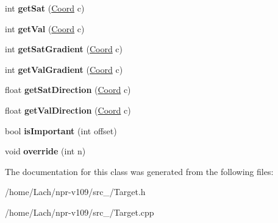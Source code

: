 \begin{DoxyCompactItemize}
\hypertarget{classTarget_a926aa4ee64a304bb5bd531618f169177}{}\label{classTarget_a926aa4ee64a304bb5bd531618f169177} 
int {\bfseries get\+Sat} (\hyperlink{structCoord}{Coord} c)
\item 
\hypertarget{classTarget_ac38c919ecd0a1965f97747fa289e2eef}{}\label{classTarget_ac38c919ecd0a1965f97747fa289e2eef} 
int {\bfseries get\+Val} (\hyperlink{structCoord}{Coord} c)
\item 
\hypertarget{classTarget_a241d781ae2c23024f84fc11f0937e91f}{}\label{classTarget_a241d781ae2c23024f84fc11f0937e91f} 
int {\bfseries get\+Sat\+Gradient} (\hyperlink{structCoord}{Coord} c)
\item 
\hypertarget{classTarget_aeb30c869530b4494f2e141a1a81df15e}{}\label{classTarget_aeb30c869530b4494f2e141a1a81df15e} 
int {\bfseries get\+Val\+Gradient} (\hyperlink{structCoord}{Coord} c)
\item 
\hypertarget{classTarget_a5f8130358abc7aabbfe6c8434cefbf0b}{}\label{classTarget_a5f8130358abc7aabbfe6c8434cefbf0b} 
float {\bfseries get\+Sat\+Direction} (\hyperlink{structCoord}{Coord} c)
\item 
\hypertarget{classTarget_aa9305d4a666a0817fb482a93a1acb5d5}{}\label{classTarget_aa9305d4a666a0817fb482a93a1acb5d5} 
float {\bfseries get\+Val\+Direction} (\hyperlink{structCoord}{Coord} c)
\item 
\hypertarget{classTarget_a76cdb1404d38641f8822e08a0b35a9e6}{}\label{classTarget_a76cdb1404d38641f8822e08a0b35a9e6} 
bool {\bfseries is\+Important} (int offset)
\item 
\hypertarget{classTarget_ae6ff0c54b062b9f8de3027e22b84a987}{}\label{classTarget_ae6ff0c54b062b9f8de3027e22b84a987} 
void {\bfseries override} (int n)
\end{DoxyCompactItemize}


The documentation for this class was generated from the following files\+:\begin{DoxyCompactItemize}
\item 
/home/\+Lach/npr-\/v109/src\+\_/Target.\+h\item 
/home/\+Lach/npr-\/v109/src\+\_/Target.\+cpp\end{DoxyCompactItemize}
